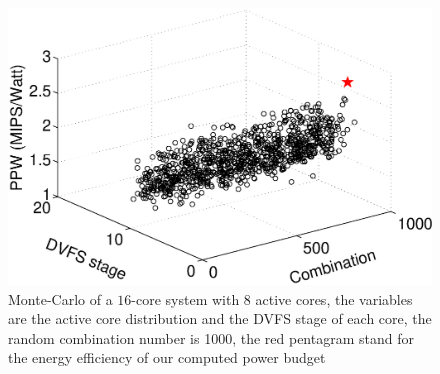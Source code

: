 \begin{figure}
\centering
\includegraphics[width=1\linewidth]{fig/best_steady.eps}
\caption{Monte-Carlo of a $16$-core system with $8$ active cores, the variables are the active core distribution and the DVFS stage of each core, the random combination number is 1000, the red pentagram stand for the energy efficiency of our computed power budget}
\end{figure}



